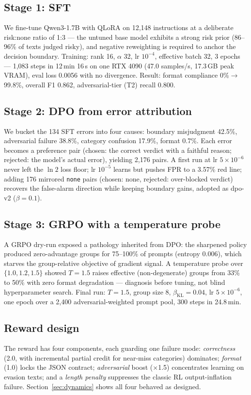 \documentclass[11pt]{article}
\begin{document}
\subsection{Stage 1: SFT}
We fine-tune Qwen3-1.7B \citep{qwen3technical} with QLoRA \citep{dettmers2023qlora} on 12{,}148 instructions at a deliberate risk:none ratio of 1:3 --- the untuned base model exhibits a strong risk prior (86--96\% of texts judged risky), and negative reweighting is required to anchor the decision boundary. Training: rank 16, $\alpha$ 32, lr $10^{-4}$, effective batch 32, 3 epochs --- 1{,}083 steps in 12\,min 16\,s on one RTX 4090 (47.0 samples/s, 17.3\,GB peak VRAM), eval loss 0.0056 with no divergence. Result: format compliance 0\%$\rightarrow$99.8\%, overall F1 0.862, adversarial-tier (T2) recall 0.800.

\subsection{Stage 2: DPO from error attribution}
We bucket the 134 SFT errors into four causes: boundary misjudgment 42.5\%, adversarial failure 38.8\%, category confusion 17.9\%, format 0.7\%. Each error becomes a preference pair (chosen: the correct verdict with a faithful reason; rejected: the model's actual error), yielding 2{,}176 pairs. A first run at lr $5\times10^{-6}$ never left the $\ln 2$ loss floor; lr $10^{-5}$ learns but pushes FPR to a 3.57\% red line; adding 176 mirrored \texttt{none} pairs (chosen: none, rejected: over-blocked verdict) recovers the false-alarm direction while keeping boundary gains, adopted as dpo-v2 ($\beta=0.1$).

\subsection{Stage 3: GRPO with a temperature probe}
A GRPO \citep{shao2024deepseekmath} dry-run exposed a pathology inherited from DPO: the sharpened policy produced zero-advantage groups for 75--100\% of prompts (entropy 0.006), which starves the group-relative objective of gradient signal. A temperature probe over $\{1.0, 1.2, 1.5\}$ showed $T=1.5$ raises effective (non-degenerate) groups from 33\% to 50\% with zero format degradation --- diagnosis before tuning, not blind hyperparameter search. Final run: $T=1.5$, group size 8, $\beta_{\mathrm{KL}}=0.04$, lr $5\times10^{-6}$, one epoch over a 2{,}400 adversarial-weighted prompt pool, 300 steps in 24.8\,min.

\subsection{Reward design}
The reward has four components, each guarding one failure mode: \emph{correctness} (2.0, with incremental partial credit for near-miss categories) dominates; \emph{format} (1.0) locks the JSON contract; \emph{adversarial} boost ($\times$1.5) concentrates learning on evasion texts; and a \emph{length penalty} suppresses the classic RL output-inflation failure. Section~\ref{sec:dynamics} shows all four behaved as designed.
\end{document}
